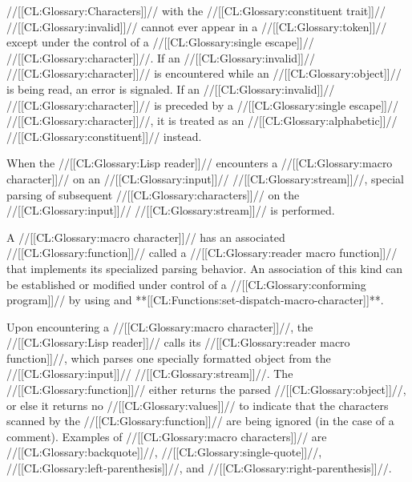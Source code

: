//[[CL:Glossary:Characters]]// with the //[[CL:Glossary:constituent trait]]// //[[CL:Glossary:invalid]]// 
cannot ever appear in a //[[CL:Glossary:token]]// 
except under the control of a //[[CL:Glossary:single escape]]// //[[CL:Glossary:character]]//.
If an //[[CL:Glossary:invalid]]// //[[CL:Glossary:character]]// is encountered while an //[[CL:Glossary:object]]// is
being read, an error  is signaled.
If an //[[CL:Glossary:invalid]]// //[[CL:Glossary:character]]// is preceded by a //[[CL:Glossary:single escape]]// //[[CL:Glossary:character]]//,
it is treated as an //[[CL:Glossary:alphabetic]]// //[[CL:Glossary:constituent]]// instead.

\endsubsubsection%


When the //[[CL:Glossary:Lisp reader]]// encounters a //[[CL:Glossary:macro character]]// 
on an //[[CL:Glossary:input]]// //[[CL:Glossary:stream]]//,
special parsing of subsequent //[[CL:Glossary:characters]]// 
on the //[[CL:Glossary:input]]// //[[CL:Glossary:stream]]// 
is performed.

A //[[CL:Glossary:macro character]]// has an associated //[[CL:Glossary:function]]//
called a //[[CL:Glossary:reader macro function]]// that implements its specialized parsing behavior.
An association of this kind can be established or modified under control of
a //[[CL:Glossary:conforming program]]// by using 
 and **[[CL:Functions:set-dispatch-macro-character]]**.

Upon encountering a //[[CL:Glossary:macro character]]//, the //[[CL:Glossary:Lisp reader]]// calls its
//[[CL:Glossary:reader macro function]]//, which parses one specially formatted object 
from the //[[CL:Glossary:input]]// //[[CL:Glossary:stream]]//.
The //[[CL:Glossary:function]]// either returns the parsed //[[CL:Glossary:object]]//,
or else it returns no //[[CL:Glossary:values]]// 
    to indicate that the characters scanned by the //[[CL:Glossary:function]]//
    are being ignored (\eg in the case of a comment).
Examples of //[[CL:Glossary:macro characters]]//
are //[[CL:Glossary:backquote]]//, //[[CL:Glossary:single-quote]]//, //[[CL:Glossary:left-parenthesis]]//, and 
//[[CL:Glossary:right-parenthesis]]//.

